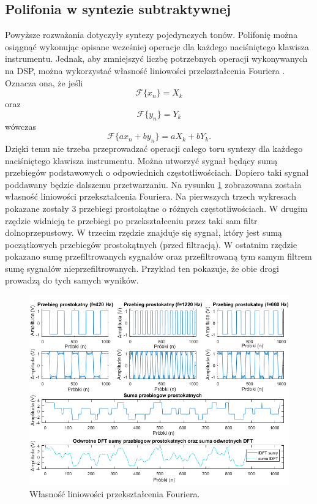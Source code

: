 \subsection{Polifonia w syntezie subtraktywnej}
Powyższe rozważania dotyczyły syntezy pojedynczych tonów. Polifonię można osiągnąć wykonując opisane wcześniej operacje dla każdego naciśniętego klawisza instrumentu. Jednak, aby zmniejszyć liczbę potrzebnych operacji wykonywanych na DSP, można wykorzystać własność liniowości przekształcenia Fouriera \cite{schafer}. Oznacza ona, że jeśli
 \begin{equation} \label{equ:sub_5}
 \mathcal{F}\{x_n\} = X_k
 \end{equation}
 oraz 
  \begin{equation} \label{equ:sub_6}
 \mathcal{F}\{y_n\} = Y_k
 \end{equation}
 wówczas
  \begin{equation} \label{equ:sub_7}
\mathcal{F}\{ax_n + by_n\} = aX_k + bY_k.
\end{equation} 
Dzięki temu nie trzeba przeprowadzać operacji całego toru syntezy dla każdego naciśniętego klawisza instrumentu. Można utworzyć sygnał będący sumą przebiegów podstawowych o odpowiednich częstotliwościach. Dopiero taki sygnał poddawany będzie dalszemu przetwarzaniu. Na rysunku \ref{rys:sub_linearity}	zobrazowana została własność liniowości przekształcenia Fouriera. Na pierwszych trzech wykresach pokazane zostały 3 przebiegi prostokątne o różnych częstotliwościach. W drugim rzędzie widnieją te przebiegi po przekształceniu przez taki sam filtr dolnoprzepustowy. W trzecim rzędzie znajduje się sygnał, który jest sumą początkowych przebiegów prostokątnych (przed filtracją). W ostatnim rzędzie pokazano sumę przefiltrowanych sygnałów oraz przefiltrowaną tym samym filtrem sumę sygnałów nieprzefiltrowanych. Przykład ten pokazuje, że obie drogi prowadzą do tych samych wyników.
\begin{figure}[H]
	\centering
	\includegraphics[width=16cm]{grafiki/sub_linearity}
	\captionsetup{justification=centering}
	\caption{Własność liniowości przekształcenia Fouriera.}
	\label{rys:sub_linearity}
\end{figure}


